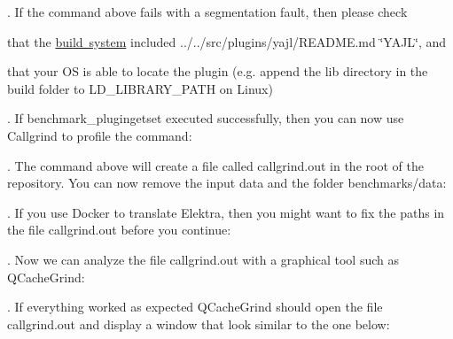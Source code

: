 . If the command above fails with a segmentation fault, then please check


\begin{DoxyItemize}
\item that the \mbox{\hyperlink{doc_COMPILE_md}{build system}} included ../../src/plugins/yajl/\+R\+E\+A\+D\+ME.md \char`\"{}\+Y\+A\+J\+L\char`\"{}, and
\item that your OS is able to locate the plugin (e.\+g. append the {\ttfamily lib} directory in the build folder to {\ttfamily L\+D\+\_\+\+L\+I\+B\+R\+A\+R\+Y\+\_\+\+P\+A\+TH} on Linux)
\end{DoxyItemize}

. If {\ttfamily benchmark\+\_\+plugingetset} executed successfully, then you can now use Callgrind to profile the command\+:


\begin{DoxyCode}{0}
\end{DoxyCode}


. The command above will create a file called {\ttfamily callgrind.\+out} in the root of the repository. You can now remove the input data and the folder {\ttfamily benchmarks/data}\+:


\begin{DoxyCode}{0}
\end{DoxyCode}


. If you use Docker to translate Elektra, then you might want to fix the paths in the file {\ttfamily callgrind.\+out} before you continue\+:


\begin{DoxyCode}{0}
\end{DoxyCode}


. Now we can analyze the file {\ttfamily callgrind.\+out} with a graphical tool such as Q\+Cache\+Grind\+:


\begin{DoxyCode}{0}
\end{DoxyCode}


. If everything worked as expected Q\+Cache\+Grind should open the file {\ttfamily callgrind.\+out} and display a window that look similar to the one below\+:



